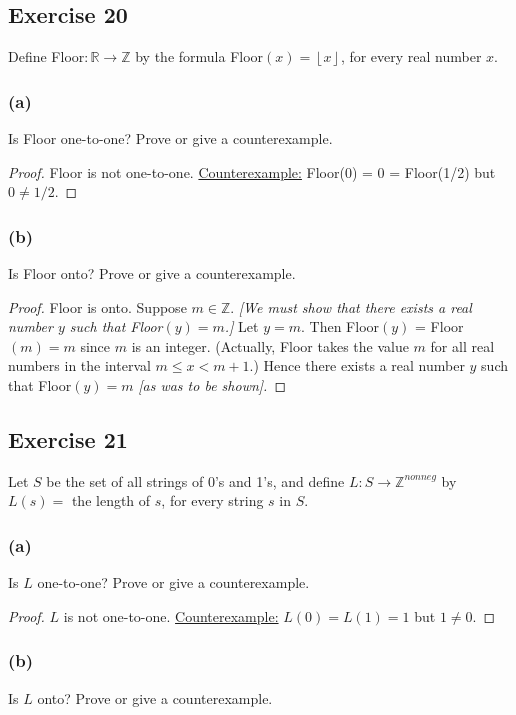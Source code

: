 \documentclass[14pt]{extarticle}
\newcommand{\R}{\mathbb{R}}
\newcommand{\Z}{\mathbb{Z}}
\newcommand{\floor}[1]{{\left\lfloor#1\right\rfloor}}
\begin{document}
\subsection{Exercise 20}
Define Floor\(: \R \to \Z\) by the formula Floor\((x) = \floor{x}\), for every real number $x$.

\subsubsection{(a)}
Is Floor one-to-one? Prove or give a counterexample.

\begin{proof}
    Floor is not one-to-one. \underline{Counterexample:} Floor(0) = 0 = Floor(1/2) but $0 \neq 1/2$.
\end{proof}

\subsubsection{(b)}
Is Floor onto? Prove or give a counterexample.

\begin{proof}
    Floor is onto. Suppose $m \in \Z$. {\it [We must show that there exists a real number $y$ such that Floor$(y) = m$.]}
    Let $y = m$. Then Floor$(y)$ = Floor$(m) = m$ since $m$ is an integer. (Actually, Floor takes the value $m$ for all
    real numbers in the interval \(m \leq x < m + 1\).) Hence there exists a real number $y$ such that Floor$(y) = m$
    {\it [as was to be shown].}
\end{proof}

\subsection{Exercise 21}
Let $S$ be the set of all strings of 0’s and 1’s, and define \(L: S \to \Z^{nonneg}\) by \(L(s) =\) the length of
$s$, for every string $s$ in $S$.

\subsubsection{(a)}
Is $L$ one-to-one? Prove or give a counterexample.

\begin{proof}
    $L$ is not one-to-one. \underline{Counterexample:} \(L(0) = L(1) = 1\) but $1 \neq 0$.
\end{proof}

\subsubsection{(b)}
Is $L$ onto? Prove or give a counterexample.
\end{document}
